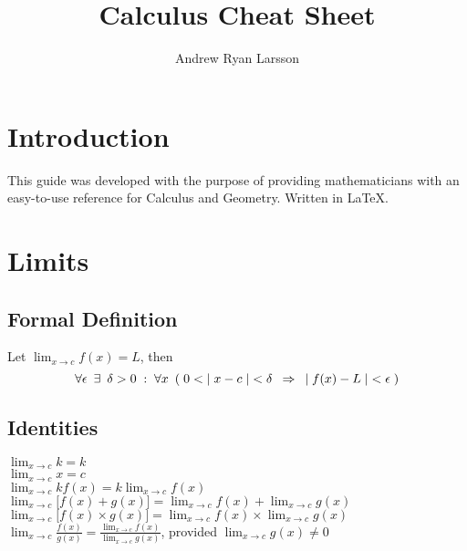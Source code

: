 \documentclass[a4paper]{article}
\title{Calculus Cheat Sheet}
\author{Andrew Ryan Larsson}
\begin{document}
\maketitle

\section{Introduction}

This guide was developed with the purpose of providing mathematicians with an easy-to-use reference for Calculus and Geometry. Written in \LaTeX{}.

\section{Limits}

\subsection{Formal Definition}

Let $\displaystyle \lim_{x \rightarrow c} f(x) = L$, then
$$\forall \epsilon \enskip \exists \enskip \delta > 0 \; : \; \forall x \enskip ( \; 0 < | \; x - c \; | < \delta \enskip \Rightarrow \enskip | \; f(x) - L \; | < \epsilon \; )$$

\subsection{Identities}

$\displaystyle \lim_{x \rightarrow c} k = k$ \\

$\displaystyle \lim_{x \rightarrow c} x = c$ \\

$\displaystyle \lim_{x \rightarrow c} k f(x) = k \lim_{x \rightarrow c} f(x)$ \\

$\displaystyle \lim_{x \rightarrow c} \big[ f(x) + g(x) \big] = \lim_{x \rightarrow c} f(x) + \lim_{x \rightarrow c} g(x)$ \\

$\displaystyle \lim_{x \rightarrow c} \big[ f(x) \times g(x) \big] = \lim_{x \rightarrow c} f(x) \times \lim_{x \rightarrow c} g(x)$ \\

$\displaystyle \lim_{x \rightarrow c} \frac{f(x)}{g(x)} = \frac{\displaystyle \lim_{x \rightarrow c} f(x)}{\displaystyle \lim_{x \rightarrow c} g(x)}$, provided $\displaystyle \lim_{x \rightarrow c} g(x) \neq 0$ \\
\end{document}
